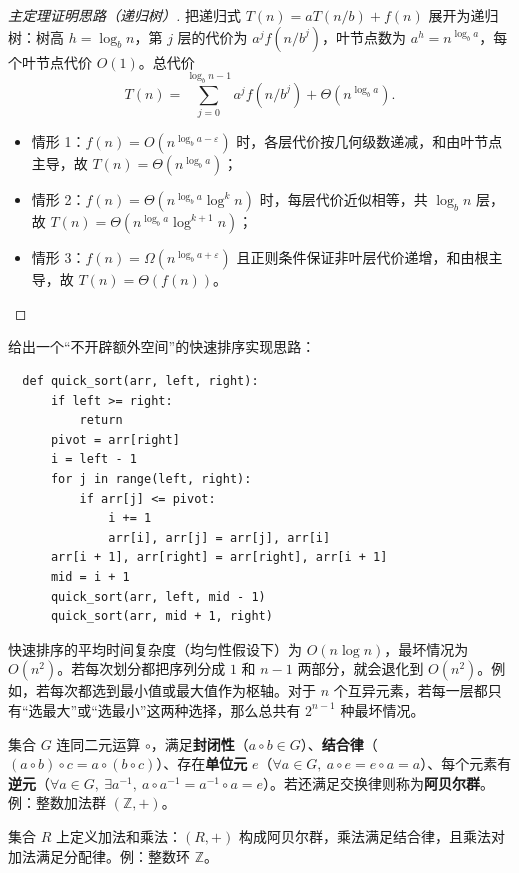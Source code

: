 \documentclass[12pt]{article}
\begin{document}
\begin{proof}[主定理证明思路（递归树）]
  把递归式 $T(n)=aT(n/b)+f(n)$ 展开为递归树：树高 $h=\log_b n$，第 $j$ 层的代价为 $a^j f(n/b^j)$，叶节点数为 $a^h = n^{\log_b a}$，每个叶节点代价 $O(1)$。总代价
  \[
    T(n)=\sum_{j=0}^{\log_b n-1} a^j f(n/b^j) + \Theta(n^{\log_b a}).
  \]
  \begin{itemize}
    \item 情形 1：$f(n)=O(n^{\log_b a-\varepsilon})$ 时，各层代价按几何级数递减，和由叶节点主导，故 $T(n)=\Theta(n^{\log_b a})$；
    \item 情形 2：$f(n)=\Theta(n^{\log_b a}\log^k n)$ 时，每层代价近似相等，共 $\log_b n$ 层，故 $T(n)=\Theta(n^{\log_b a}\log^{k+1} n)$；
    \item 情形 3：$f(n)=\Omega(n^{\log_b a+\varepsilon})$ 且正则条件保证非叶层代价递增，和由根主导，故 $T(n)=\Theta(f(n))$。
  \end{itemize}
\end{proof}
\begin{note}
  给出一个“不开辟额外空间”的快速排序实现思路：
  \begin{verbatim}
  def quick_sort(arr, left, right):
      if left >= right:
          return
      pivot = arr[right]
      i = left - 1
      for j in range(left, right):
          if arr[j] <= pivot:
              i += 1
              arr[i], arr[j] = arr[j], arr[i]
      arr[i + 1], arr[right] = arr[right], arr[i + 1]
      mid = i + 1
      quick_sort(arr, left, mid - 1)
      quick_sort(arr, mid + 1, right)
  \end{verbatim}
\end{note}
\begin{note}
  快速排序的平均时间复杂度（均匀性假设下）为 $O(n \log n)$，最坏情况为 $O(n^2)$。若每次划分都把序列分成 $1$ 和 $n-1$ 两部分，就会退化到 $O(n^2)$。例如，若每次都选到最小值或最大值作为枢轴。对于 $n$ 个互异元素，若每一层都只有“选最大”或“选最小”这两种选择，那么总共有 $2^{n-1}$ 种最坏情况。
\end{note}
\begin{defn}[群（group）]
  集合 $G$ 连同二元运算 $\circ$，满足\textbf{封闭性}（$a\circ b\in G$）、\textbf{结合律}（$(a\circ b)\circ c=a\circ(b\circ c)$）、存在\textbf{单位元} $e$（$\forall a\in G,\ a\circ e=e\circ a=a$）、每个元素有\textbf{逆元}（$\forall a\in G,\ \exists a^{-1},\ a\circ a^{-1}=a^{-1}\circ a=e$）。若还满足交换律则称为\textbf{阿贝尔群}。例：整数加法群 $(\mathbb{Z},+)$。
\end{defn}

\begin{defn}[环（ring）]
  集合 $R$ 上定义加法和乘法：$(R,+)$ 构成阿贝尔群，乘法满足结合律，且乘法对加法满足分配律。例：整数环 $\mathbb{Z}$。
\end{defn}
\end{document}
